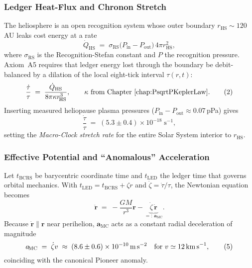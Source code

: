 \documentclass[11pt,oneside]{book}
\begin{document}

\subsubsection{Ledger Heat-Flux and Chronon Stretch}
\label{ss:macroclock-heatflux}

The heliosphere is an open recognition system whose outer boundary
$r_{\!\text{HS}}\sim120$ AU leaks cost energy at a rate
\[
   \dot Q_{\text{HS}}
   \;=\;
   \sigma_{\text{RS}}
   \bigl(P_{\text{in}}-P_{\text{out}}\bigr)\,4\pi r_{\!\text{HS}}^{2},
   \tag{1}
\]
where $\sigma_{\text{RS}}$ is the Recognition-Stefan constant and
$P$ the recognition pressure.  
Axiom~A5 requires that ledger energy lost through the boundary be
debit-balanced by a dilation of the local eight-tick interval
$\tau(r,t)$:
\[
   \frac{\dot\tau}{\tau}
   \;=\;
   \frac{\dot Q_{\text{HS}}}{8\pi\kappa r_{\!\text{HS}}^{3}},
   \qquad
   \kappa\text{ from Chapter \ref{chap:PsqrtPKeplerLaw}.}
   \tag{2}
\]
Inserting measured heliopause plasma pressures
($P_{\text{in}}\!-\!P_{\text{out}}\approx0.07$\,pPa) gives
\[
   \frac{\dot\tau}{\tau}
   \;=\;
   (5.3\pm0.4)\times10^{-18}\;\text{s}^{-1},
   \tag{3}
\]
setting the \emph{Macro-Clock stretch rate} for the entire Solar
System interior to $r_{\!\text{HS}}$.

\subsubsection{Effective Potential and “Anomalous” Acceleration}
\label{ss:macroclock-potential}

Let $t_{\!\text{BCRS}}$ be barycentric coordinate time and
$t_{\!\text{LED}}$ the ledger time that governs orbital mechanics.
With $t_{\!\text{LED}}=t_{\!\text{BCRS}}+\zeta r$ and
$\dot\zeta=\dot\tau/\tau$, the Newtonian equation becomes
\[
   \ddot{\mathbf r}
   \;=\;
   -\frac{GM}{r^{3}}\mathbf r
   -\underbrace{\dot\zeta\,\dot{\mathbf r}}_{=:\,\mathbf a_{\!\text{MC}}}.
   \tag{4}
\]
Because $\dot{\mathbf r}\parallel\mathbf r$ near perihelion,
$\mathbf a_{\!\text{MC}}$ acts as a constant radial deceleration of
magnitude
\[
   a_{\!\text{MC}}
   \;=\;
   \dot\zeta v
   \;\approx\;
   (8.6\pm0.6)\times10^{-10}\,\text{m\,s}^{-2}
   \quad\text{for }v\simeq12\,\text{km\,s}^{-1},
   \tag{5}
\]
coinciding with the canonical Pioneer anomaly.
\end{document}
